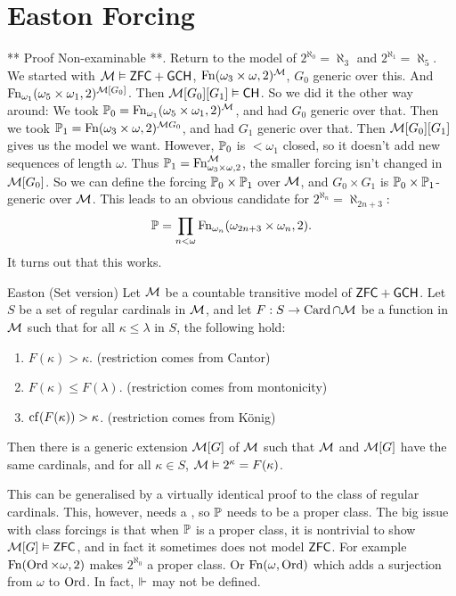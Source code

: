 \documentclass{article}
\begin{document}
    \section{Easton Forcing}
    ** Proof Non-examinable **.\gap
    Return to the model of $2^{\aleph_{0}}=\aleph_{3}$ and $2^{\aleph_{1}}=\aleph_{5}$. We started with $\mathcal{M} \vDash \mathsf{ZFC} + \mathsf{GCH}$, $\operatorname{Fn}(\omega_{3} \times \omega, 2)^{\mathcal{M}}$, $G_{0}$ generic over this. And $\operatorname{Fn}_{\omega_{1}}(\omega_{5} \times \omega_{1}, 2)^{\mathcal{M}[G_{0}]}$. Then $\mathcal{M}[G_{0}][G_{1}] \vDash \mathsf{CH}$. So we did it the other way around:\gap
    We took $\mathbb{P}_{0} = \operatorname{Fn}_{\omega_{1}}(\omega_{5} \times \omega_{1},2)^{\mathcal{M}}$, and had $G_{0}$ generic over that. Then we took $\mathbb{P}_{1} = \operatorname{Fn}(\omega_{3} \times \omega, 2)^{\mathcal{M}{G_{0}}}$, and had $G_{1}$ generic over that. Then $\mathcal{M}[G_{0}][G_{1}]$ gives us the model we want. \gap
    However, $\mathbb{P}_{0}$ is $<\omega_{1}$ closed, so it doesn't add new sequences of length $\omega$. Thus $\mathbb{P}_{1} = \operatorname{Fn}_{\omega_{3} \times \omega,2}^{\mathcal{M}}$, the smaller forcing isn't changed in $\mathcal{M}[G_{0}]$. So we can define the forcing $\mathbb{P}_{0} \times \mathbb{P}_{1}$ over $\mathcal{M}$, and $G_{0} \times G_{1}$ is $\mathbb{P}_{0} \times \mathbb{P}_{1}$-generic over $\mathcal{M}$. \gap
    This leads to an obvious candidate for $2^{\aleph_{n}}=\aleph_{2n+3}$: \[ \mathbb{P} = \prod_{n < \omega} \operatorname{Fn}_{\omega_{n}}(\omega_{2n+3} \times \omega_{n}, 2).\]
It turns out that this works.
\begin{fancythm}{Easton (Set version)}
    Let $\mathcal{M}$ be a countable transitive model of $\mathsf{ZFC} + \mathsf{GCH}$. Let $S$ be a set of regular cardinals in $\mathcal{M}$, and let $F : S \to \operatorname{Card} \cap \mathcal{M}$ be a function in $\mathcal{M}$ such that for all $\kappa \leq \lambda$ in $S$, the following hold: \begin{enumerate}
        \item[(i)] $F(\kappa) > \kappa$.  (restriction comes from Cantor)
        \item[(ii)] $F(\kappa) \leq F(\lambda)$. (restriction comes from montonicity)
        \item[(iii)] $\operatorname{cf}(F(\kappa)) > \kappa$. (restriction comes from K\"onig)
    \end{enumerate}
    Then there is a generic extension $\mathcal{M}[G]$ of $\mathcal{M}$ such that $\mathcal{M}$ and $\mathcal{M}[G]$ have the same cardinals, and for all $\kappa \in S$, $\mathcal{M} \vDash 2^{\kappa}=F(\kappa)$.
\end{fancythm}
\begin{remark*}
    This can be generalised by a virtually identical proof to the class of regular cardinals. This, however, needs a , so $\mathbb{P}$ needs to be a proper class. The big issue with class forcings is that when $\mathbb{P}$ is a proper class, it is nontrivial to show $\mathcal{M}[G] \vDash \mathsf{ZFC}$, and in fact it sometimes does not model $\mathsf{ZFC}$. For example $\operatorname{Fn}(\operatorname{Ord} \times \omega, 2)$ makes $2^{\aleph_{0}}$ a proper class. Or $\operatorname{Fn}(\omega,\operatorname{Ord})$ which adds a surjection from $\omega$ to $\operatorname{Ord}$. \gap
    In fact, $\Vdash$ may not be defined.
\end{remark*}
\end{document}
